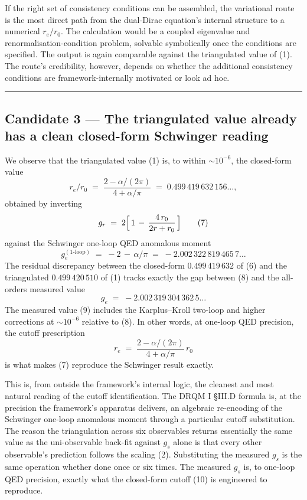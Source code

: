 \documentclass[
  11pt,
]{article}
\begin{document}
If the right set of consistency conditions can be assembled, the
variational route is the most direct path from the dual-Dirac equation's
internal structure to a numerical \(r_e/r_0\). The calculation would be
a coupled eigenvalue and renormalisation-condition problem, solvable
symbolically once the conditions are specified. The output is again
comparable against the triangulated value of (1). The route's
credibility, however, depends on whether the additional consistency
conditions are framework-internally motivated or look ad hoc.

\begin{center}\rule{0.5\linewidth}{0.5pt}\end{center}

\hypertarget{candidate-3-the-triangulated-value-already-has-a-clean-closed-form-schwinger-reading}{%
\subsection{Candidate 3 --- The triangulated value already has a clean
closed-form Schwinger
reading}\label{candidate-3-the-triangulated-value-already-has-a-clean-closed-form-schwinger-reading}}

We observe that the triangulated value (1) is, to within
\(\sim 10^{-6}\), the closed-form value \[
r_e/r_0 \;=\; \frac{2 - \alpha/(2\pi)}{4 + \alpha/\pi} \;=\; 0.499\,419\,632\,156\ldots, \tag{6}
\] obtained by inverting \[
g_r \;=\; 2\Bigl[\,1 \,-\, \frac{4\,r_0}{2r + r_0}\,\Bigr] \tag{7}
\] against the Schwinger one-loop QED anomalous moment \[
g_e^{(1\text{-loop})} \;=\; -2 \,-\, \alpha/\pi \;=\; -2.002\,322\,819\,465\,7\ldots \tag{8}
\] The residual discrepancy between the closed-form \(0.499\,419\,632\)
of (6) and the triangulated \(0.499\,420\,510\) of (1) tracks exactly
the gap between (8) and the all-orders measured value \[
g_e \;=\; -2.002\,319\,304\,362\,5\ldots \tag{9}
\] The measured value (9) includes the Karplus--Kroll two-loop and
higher corrections at \(\sim 10^{-6}\) relative to (8). In other words,
at one-loop QED precision, the cutoff prescription \[
r_e \;=\; \frac{2 - \alpha/(2\pi)}{4 + \alpha/\pi}\,r_0 \tag{10}
\] is what makes (7) reproduce the Schwinger result exactly.

This is, from outside the framework's internal logic, the cleanest and
most natural reading of the cutoff identification. The DRQM I §III.D
formula is, at the precision the framework's apparatus delivers, an
algebraic re-encoding of the Schwinger one-loop anomalous moment through
a particular cutoff substitution. The reason the triangulation across
six observables returns essentially the same value as the uni-observable
back-fit against \(g_s\) alone is that every other observable's
prediction follows the scaling (2). Substituting the measured \(g_s\) is
the same operation whether done once or six times. The measured \(g_s\)
is, to one-loop QED precision, exactly what the closed-form cutoff (10)
is engineered to reproduce.
\end{document}
